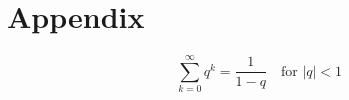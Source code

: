 \section{Appendix}
\noindent\begin{equation*}
    \sum_{k=0}^{\infty} q^k = \frac{1}{1-q} \quad \text{for } |q| < 1
\end{equation*}